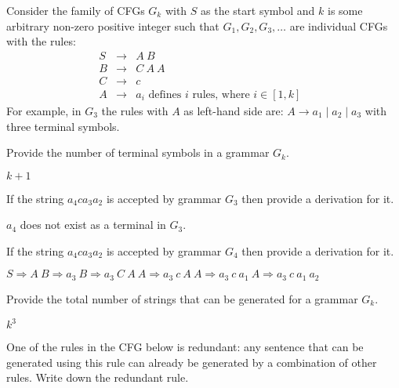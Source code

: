 \documentclass[12pt]{article}
\newcommand{\cfgrule}[2]{#1 & \rightarrow & #2 \nonumber}
\begin{document}
\begin{exe}
\begin{xlist}
\begin{comment}
\noindent Notice that the tree constructed using the leftmost derivation is identical
to the tree constructed using the rightmost derivation
\end{soln}

 }
\end{comment}

\end{xlist}

\bigskip
\ex\label{derivs} Consider the family of CFGs $G_k$ with $S$ as the start symbol and $k$ is some arbitrary non-zero positive integer such that $G_1, G_2, G_3, \ldots$ are individual CFGs with the rules:
\begin{eqnarray*}
\cfgrule{S}{A\ B} \\
\cfgrule{B}{C\ A\ A} \\
\cfgrule{C}{c} \\
\cfgrule{A}{a_i \textrm{\ \ \ defines $i$ rules, where $i \in [1,k]$ }}
\end{eqnarray*}
For example, in $G_3$ the rules with $A$ as left-hand side are: $A \rightarrow a_1 \mid a_2 \mid a_3$ with three terminal symbols.

\begin{xlist}

{\ex Provide the number of terminal symbols in a grammar $G_k$.
\begin{soln}
$k+1$
\end{soln}
}

{\ex If the string $a_4 c a_3 a_2$ is accepted by grammar $G_3$ then provide a derivation for it.
\begin{soln}
$a_4$ does not exist as a terminal in $G_3$.
\end{soln}
}

{\ex If the string $a_4 c a_3 a_2$ is accepted by grammar $G_4$ then provide a derivation for it.
\begin{soln}
$S \Rightarrow A\ B \Rightarrow a_3\ B \Rightarrow a_3\ C\ A\ A \Rightarrow a_3\ c\ A\ A \Rightarrow a_3\ c\ a_1\ A \Rightarrow a_3\ c\ a_1\ a_2$
\end{soln}
}

{\ex Provide the total number of strings that can be generated for a grammar $G_k$.
\begin{soln}
$k^3$
\end{soln}
}

\end{xlist}

\bigskip
\ex\label{nlg}

One of the rules in the CFG below is redundant: any sentence that
can be generated using this rule can already be generated by a
combination of other rules. Write down the redundant rule.


\end{exe}
\end{document}
